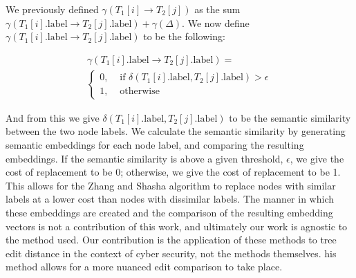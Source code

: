 We previously defined $\gamma\left(T_1[i] \rightarrow T_2[j]\right)$  as the sum $\gamma({T_1[i].\text{label}} \rightarrow {T_2[j].\text{label}}) + \gamma(\Delta)$. We now define $\gamma\left(T_1[i].\text{label} \rightarrow T_2[j].\text{label}\right)$ to be the following:

\begin{multline*}
    \gamma\left(T_1[i].\text{label} \rightarrow T_2[j].\text{label}\right)=\\\left\{\begin{array}{ll}
        0, & \text { if } \delta\left(T_1[i].\text{label}, T_2[j].\text{label}\right)>\epsilon \\
        1, & \text { otherwise }
    \end{array}\right.
\end{multline*}

And from this we give $\delta\left(T_1[i].\text{label}, T_2[j].\text{label}\right)$ to be the semantic similarity between the two node labels. We calculate the semantic similarity by generating semantic embeddings for each node label, and comparing the resulting embeddings. If the semantic similarity is above a given threshold, $\epsilon$, we give the cost of replacement to be 0; otherwise, we give the cost of replacement to be 1. This allows for the Zhang and Shasha algorithm to replace nodes with similar labels at a lower cost than nodes with dissimilar labels. The manner in which these embeddings are created and the comparison of the resulting embedding vectors is not a contribution of this work, and ultimately our work is agnostic to the method used. Our contribution is the application of these methods to tree edit distance in the context of cyber security, not the methods themselves. his method allows for a more nuanced edit comparison to take place. 





